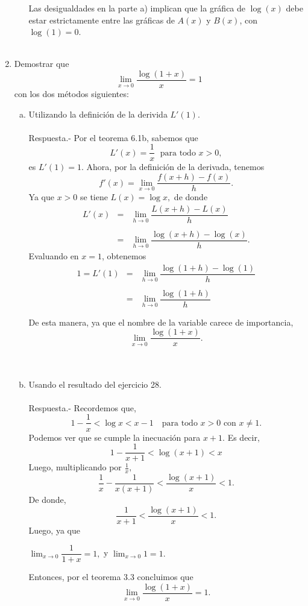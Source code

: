 \begin{enumerate}[\bfseries 1.]
\begin{enumerate}[a)]
		Las desigualdades en la parte a) implican que la gráfica de $\log(x)$ debe estar estrictamente entre las gráficas de $A(x)$ y $B(x)$, con $\log(1)=0$.\\\\

	\end{enumerate}

    \item Demostrar que 
	$$\lim_{x\to 0}\dfrac{\log(1+x)}{x}=1$$
	con los dos métodos siguientes:
	\begin{enumerate}[a)]

	    \item Utilizando la definición de la derivida $L'(1)$.\\\\
		Respuesta.-\; Por el teorema 6.1b, sabemos que 
		$$L'(x)=\dfrac{1}{x}\;\mbox{ para todo }x>0,$$
		es $L'(1)=1$. Ahora, por la definición de la derivada, tenemos
		$$f'(x)=\lim_{x\to 0}\dfrac{f(x+h)-f(x)}{h}.$$
		Ya que $x>0$ se tiene $L(x)=\log x,$ de donde
		$$
		\begin{array}{rcl}
		    L'(x)&=& \lim_{h\to 0}\dfrac{L(x+h)-L(x)}{h}\\\\
			 &=& \lim_{h\to 0}\dfrac{\log(x+h)-\log(x)}{h}.
		\end{array}
		$$
		Evaluando en $x=1$, obtenemos
		$$
		\begin{array}{rcl}
		    1 = L'(1) &=& \lim_{h\to 0}\dfrac{\log(1+h)-\log(1)}{h}\\\\
			      &=& \lim_{h\to 0}\dfrac{\log(1+h)}{h}\\\\
		\end{array}
		$$
		De esta manera, ya que el  nombre de la variable carece de importancia,
		$$\lim_{x\to 0}\dfrac{\log(1+x)}{x}.$$\\\\

	    \item Usando el resultado del ejercicio 28.\\\\
		Respuesta.-\; Recordemos que,
		$$1-\dfrac{1}{x}<\log x<x-1\quad \mbox{para todo } x>0 \mbox{ con } x\neq 1.$$
		Podemos ver que se cumple la inecuación para $x+1$. Es decir,
		$$1-\dfrac{1}{x+1}<\log(x+1)<x$$
		Luego, multiplicando por $\frac{1}{x},$
		$$\dfrac{1}{x}-\dfrac{1}{x(x+1)}<\dfrac{\log(x+1)}{x}<1.$$
		De donde,
		$$\dfrac{1}{x+1}<\dfrac{\log(x+1)}{x}<1.$$
		Luego, ya que 
		\begin{center}
		    $\lim_{x\to 0}\dfrac{1}{1+x}=1,$ y $\lim_{x\to 0}1=1.$
		\end{center}
		Entonces, por el teorema 3.3 concluimos que 
		$$\lim_{x\to 0}\dfrac{\log(1+x)}{x}=1.$$\\
		

\end{enumerate}
\end{enumerate}
